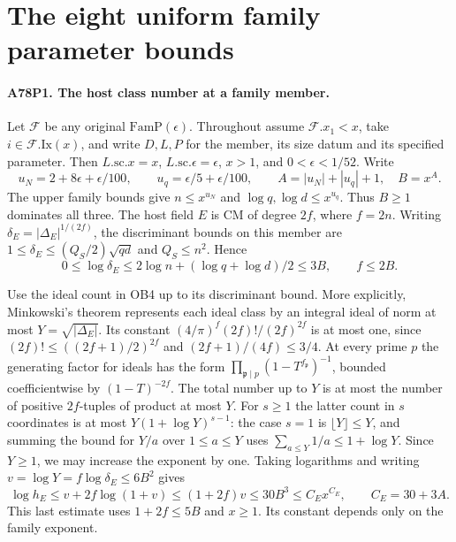 \section{The eight uniform family parameter bounds}

\paragraph{A78P1. The host class number at a family member.}
Let $\mathcal F$ be any original $\mathrm{FamP}(\epsilon)$.
Throughout assume $\mathcal F.x_1<x$, take $i\in\mathcal F.\mathrm{Ix}(x)$,
and write $D,L,P$ for the member, its size datum and its specified
parameter. Then $L.\mathrm{sc}.x=x$, $L.\mathrm{sc}.\epsilon=\epsilon$,
$x>1$, and $0<\epsilon<1/52$. Write
\[
 u_N=2+8\epsilon+\epsilon/100,\qquad u_q=\epsilon/5+\epsilon/100,
 \qquad A=|u_N|+|u_q|+1,\quad B=x^A .
\]
The upper family bounds give $n\le x^{u_N}$ and
$\log q,\log d\le x^{u_q}$. Thus $B\ge1$ dominates all three.
The host field $E$ is CM of degree $2f$, where $f=2n$. Writing
$\delta_E=|\Delta_E|^{1/(2f)}$, the discriminant bounds on this
member are $1\le\delta_E\le(Q_S/2)\sqrt{qd}$ and $Q_S\le n^2$.
Hence
\[
   0\le\log\delta_E
     \le 2\log n+(\log q+\log d)/2\le3B,\qquad f\le2B .
\]

Use the ideal count in OB4 up to its discriminant bound. More
explicitly, Minkowski's theorem represents each ideal class by an
integral ideal of norm at most $Y=\sqrt{|\Delta_E|}$. Its constant
$(4/\pi)^f (2f)!/(2f)^{2f}$ is at most one, since
$(2f)!\le((2f+1)/2)^{2f}$ and $(2f+1)/(4f)\le3/4$.
At every prime $p$ the generating factor for ideals has the form
$\prod_{\mathfrak p\mid p}(1-T^{f_{\mathfrak p}})^{-1}$, bounded
coefficientwise by $(1-T)^{-2f}$. The total number up to $Y$ is
at most the number of positive $2f$-tuples of product at most $Y$.
For $s\ge1$ the latter count in $s$ coordinates is at most
$Y(1+\log Y)^{s-1}$: the case $s=1$ is $\lfloor Y\rfloor\le Y$,
and summing the bound for $Y/a$ over $1\le a\le Y$ uses
$\sum_{a\le Y}1/a\le1+\log Y$. Since $Y\ge1$, we may increase
the exponent by one. Taking logarithms and writing
$v=\log Y=f\log\delta_E\le6B^2$ gives
\[
   \log h_E\le v+2f\log(1+v)
   \le (1+2f)v\le30B^3\le C_E x^{C_E},
   \qquad C_E=30+3A .
\]
This last estimate uses $1+2f\le5B$ and $x\ge1$. Its constant
depends only on the family exponent.

